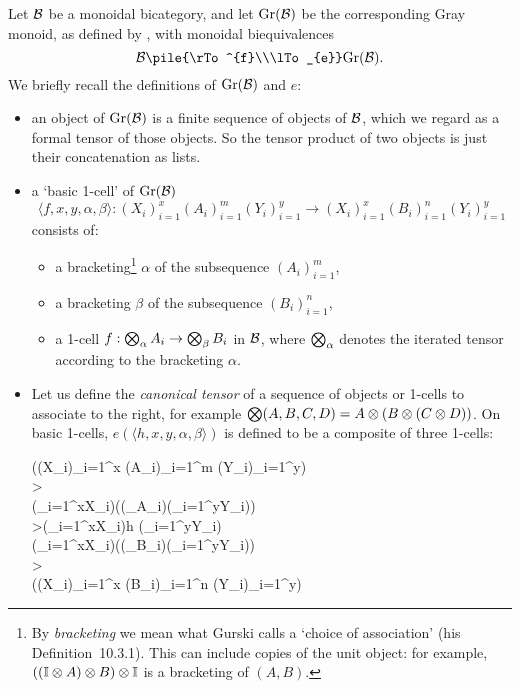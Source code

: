 \documentclass{robinthesisdraft}
\begin{document}
Let $\mathcal{B}$ be a monoidal bicategory, and let $\mathrm{Gr}(\mathcal{B})$ be the
corresponding Gray monoid, as defined by \citet[][Chapter~10]{GurskiThesis},
with monoidal biequivalences
\[
	\B \pile{\rTo^{f}\\\lTo_{e}} \Gr(\B).
\]
We briefly recall the definitions of $\mathrm{Gr}(\mathcal{B})$ and $e$:
\begin{itemize}
	\item an object of $\mathrm{Gr}(\mathcal{B})$ is a finite sequence of objects of $\mathcal{B}$,
		which we regard as a formal tensor of those objects. So the tensor
		product of two objects is just their concatenation as lists.
	\item a `basic 1-cell' of $\mathrm{Gr}(\mathcal{B})$
	\[
		\langle f,x,y,\alpha,\beta \rangle:
		(X_{i})_{i=1}^{x} (A_{i})_{i=1}^{m} (Y_{i})_{i=1}^{y}
		\to
		(X_{i})_{i=1}^{x} (B_{i})_{i=1}^{n} (Y_{i})_{i=1}^{y}
	\]
	consists of:
	\begin{itemize}
		\item a bracketing\footnote{
			By \emph{bracketing} we mean what Gurski calls a `choice of association'
			(his Definition~10.3.1). This can include copies of the unit object:
			for example, $((\I\tn A)\tn B)\tn \I$ is a bracketing of $(A,B)$.
		} $\alpha$ of the subsequence $(A_{i})_{i=1}^{m}$,
		\item a bracketing $\beta$ of the subsequence $(B_{i})_{i=1}^{n}$,
		\item a 1-cell $f: \bigotimes_{\alpha}A_{i} \to \bigotimes_{\beta}B_{i}$ in $\mathcal{B}$,
			where $\bigotimes_{\alpha}$ denotes the iterated tensor according to the
			bracketing $\alpha$.
	\end{itemize}
	\item Let us define the \emph{canonical tensor} of a sequence of objects or 1-cells to
	associate to the right, for example $\Tn(A,B,C,D) = A\tn(B\tn(C\tn D))$.
	On basic 1-cells, $e(\langle h,x,y,\alpha,\beta \rangle)$ is defined to
		be a composite of three 1-cells:
		\begin{diagram}
			\Tn((X_{i})_{i=1}^{x} (A_{i})_{i=1}^{m} (Y_{i})_{i=1}^{y}) \\
			\dTo>{\cong} \\
			(\Tn_{i=1}^{x}X_{i})\tn\bigl((\Tn_{\alpha}A_{i})\tn(\Tn_{i=1}^{y}Y_{i})\bigr) \\
			\dTo>{(\Tn_{i=1}^{x}X_{i})\tn h \tn(\Tn_{i=1}^{y}Y_{i})} \\
			(\Tn_{i=1}^{x}X_{i})\tn\bigl((\Tn_{\beta}B_{i})\tn(\Tn_{i=1}^{y}Y_{i})\bigr) \\
			\dTo>{\cong} \\
			\Tn((X_{i})_{i=1}^{x} (B_{i})_{i=1}^{n} (Y_{i})_{i=1}^{y})

\end{diagram}
\end{itemize}
\end{document}
